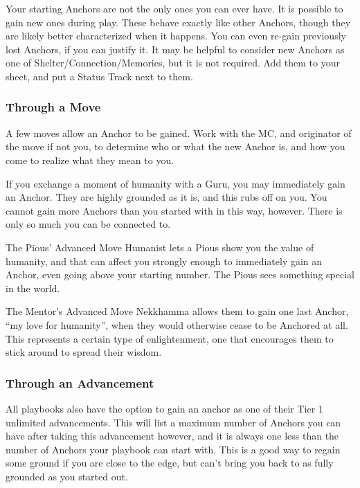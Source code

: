 \documentclass[10pt,twoside,openright]{memoir}
\begin{document}
Your starting Anchors are not the only ones you can ever have. It is
possible to gain new ones during play. These behave exactly like other
Anchors, though they are likely better characterized when it happens.
You can even re-gain previously lost Anchors, if you can justify it. It
may be helpful to consider new Anchors as one of
Shelter/Connection/Memories, but it is not required. Add them to your
sheet, and put a Status Track next to them.

\hypertarget{through-a-move}{%
\subsubsection{Through a Move}\label{through-a-move}}

A few moves allow an Anchor to be gained. Work with the MC, and
originator of the move if not you, to determine who or what the new
Anchor is, and how you come to realize what they mean to you.

If you exchange a moment of humanity with a Guru, you may immediately
gain an Anchor. They are highly grounded as it is, and this rubs off on
you. You cannot gain more Anchors than you started with in this way,
however. There is only so much you can be connected to.

The Pious' Advanced Move Humanist lets a Pious show you the value of
humanity, and that can affect you strongly enough to immediately gain an
Anchor, even going above your starting number. The Pious sees something
special in the world.

The Mentor's Advanced Move Nekkhamma allows them to gain one last
Anchor, ``my love for humanity'', when they would otherwise cease to be
Anchored at all. This represents a certain type of enlightenment, one
that encourages them to stick around to spread their wisdom.

\hypertarget{through-an-advancement}{%
\subsubsection{Through an Advancement}\label{through-an-advancement}}

All playbooks also have the option to gain an anchor as one of their
Tier 1 unlimited advancements. This will list a maximum number of
Anchors you can have after taking this advancement however, and it is
always one less than the number of Anchors your playbook can start with.
This is a good way to regain some ground if you are close to the edge,
but can't bring you back to as fully grounded as you started out.
\end{document}
